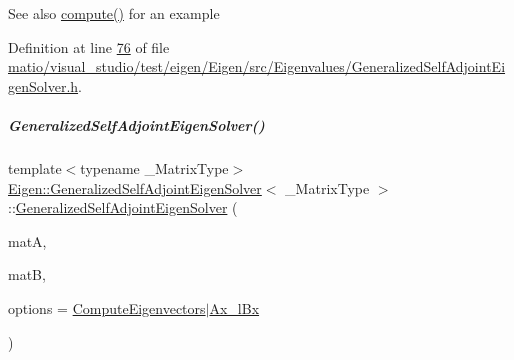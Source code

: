 \begin{DoxySeeAlso}{See also}
\hyperlink{group___eigenvalues___module_a724764fe196612b752042692156ed023}{compute()} for an example 
\end{DoxySeeAlso}


Definition at line \hyperlink{matio_2visual__studio_2test_2eigen_2_eigen_2src_2_eigenvalues_2_generalized_self_adjoint_eigen_solver_8h_source_l00076}{76} of file \hyperlink{matio_2visual__studio_2test_2eigen_2_eigen_2src_2_eigenvalues_2_generalized_self_adjoint_eigen_solver_8h_source}{matio/visual\+\_\+studio/test/eigen/\+Eigen/src/\+Eigenvalues/\+Generalized\+Self\+Adjoint\+Eigen\+Solver.\+h}.

\mbox{\label{group___eigenvalues___module_addc0409c9cb1a5ac9cbbd00efe68908e}} 
\subparagraph{\texorpdfstring{Generalized\+Self\+Adjoint\+Eigen\+Solver()}{GeneralizedSelfAdjointEigenSolver()}\hspace{0.1cm}{\footnotesize\ttfamily [6/6]}}
{\footnotesize\ttfamily template$<$typename \+\_\+\+Matrix\+Type$>$ \\
\hyperlink{group___eigenvalues___module_class_eigen_1_1_generalized_self_adjoint_eigen_solver}{Eigen\+::\+Generalized\+Self\+Adjoint\+Eigen\+Solver}$<$ \+\_\+\+Matrix\+Type $>$\+::\hyperlink{group___eigenvalues___module_class_eigen_1_1_generalized_self_adjoint_eigen_solver}{Generalized\+Self\+Adjoint\+Eigen\+Solver} (\begin{DoxyParamCaption}\item[{const Matrix\+Type \&}]{matA,  }\item[{const Matrix\+Type \&}]{matB,  }\item[{int}]{options = {\ttfamily \hyperlink{group__enums_ggae3e239fb70022eb8747994cf5d68b4a9ada93d8885bde32b876ba4af01d3292cc}{Compute\+Eigenvectors}$\vert$\hyperlink{group__enums_ggae3e239fb70022eb8747994cf5d68b4a9a1a7cefbb22c2c3928d246b753cf53633}{Ax\+\_\+l\+Bx}} }\end{DoxyParamCaption})\hspace{0.3cm}{\ttfamily [inline]}}



